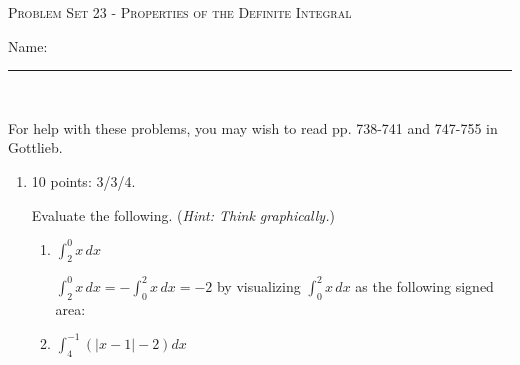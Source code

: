 \documentclass{article}
\begin{document}
\begin{center}
  \large\textsc{Problem Set 23 - Properties of the Definite Integral}
  
      \pspace{12pt}
  \begin{problemonly}\large Name: \rule{5cm}{0.15mm}\\ \end{problemonly}
\end{center}

For help with these problems, you may wish to read pp. 738-741 and 747-755 in Gottlieb.

\begin{enumerate}
\item 

\begin{grading}
10 points: 3/3/4.
\end{grading}

  Evaluate the following. (\emph{Hint: Think graphically.})  
  \probonly{}
    \begin{enumerate}
    \item
      \begin{problem}[\vfill]
        $\displaystyle \int_2^0 x\,dx$
      \end{problem}

      \begin{solution}
        $\displaystyle \int_2^0 x\,dx = -\int_0^2 x\,dx = \boxed{-2}$ by
        visualizing $\displaystyle \int_0^2 x\,dx$ as the following signed
        area:
        \begin{center}
        \end{center}
      \end{solution}

    \item
      \begin{problem}[\vfill]
        $\displaystyle \int_4^{-1} \left( |x - 1| - 2 \right) dx$
      \end{problem}


\end{enumerate}
\end{enumerate}
\end{document}
